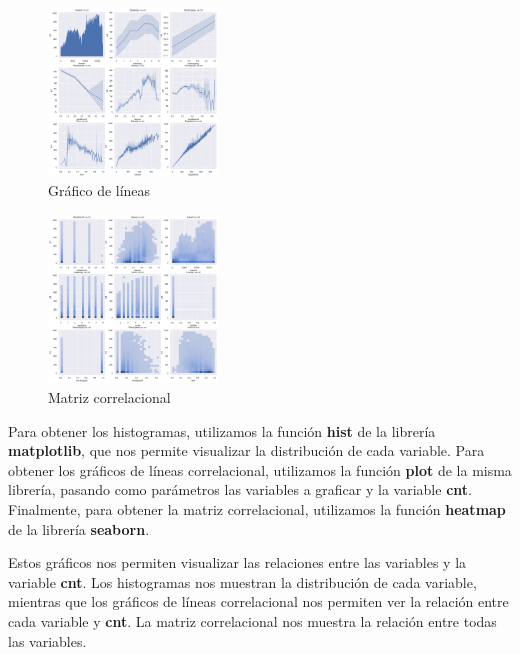 \documentclass{wsdcr}
\begin{document}
\begin{figure}[h]
    \centering
    \includegraphics[width=0.4\textwidth]{charts/line-charts.png}
    \caption{Gráfico de líneas}
    \label{fig:linecharts}
\end{figure}

\begin{figure}[h]
    \centering
    \includegraphics[width=0.4\textwidth]{charts/correlational-matrix.png}
    \caption{Matriz correlacional}
    \label{fig:correlationmatrix}
\end{figure}

Para obtener los histogramas, utilizamos la función \textbf{hist} de la librería \textbf{matplotlib}, que nos permite visualizar la distribución de cada variable. Para obtener los gráficos de líneas correlacional, utilizamos la función \textbf{plot} de la misma librería, pasando como parámetros las variables a graficar y la variable \textbf{cnt}. Finalmente, para obtener la matriz correlacional, utilizamos la función \textbf{heatmap} de la librería \textbf{seaborn}.

Estos gráficos nos permiten visualizar las relaciones entre las variables y la variable \textbf{cnt}. Los histogramas nos muestran la distribución de cada variable, mientras que los gráficos de líneas correlacional nos permiten ver la relación entre cada variable y \textbf{cnt}. La matriz correlacional nos muestra la relación entre todas las variables.
\end{document}
